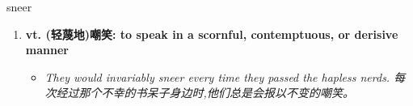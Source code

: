 
\begin{frame}
{\huge sneer}
\begin{center}
\begin{enumerate}\Large
  \item \textbf{vt. (轻蔑地)嘲笑: to speak in a scornful, contemptuous, or derisive manner}
  \begin{itemize}
    \item \em{\Large{They would invariably sneer every time they passed the hapless nerds. 每次经过那个不幸的书呆子身边时,他们总是会报以不变的嘲笑。}}
  \end{itemize}
\end{enumerate}
\end{center}
\end{frame}
